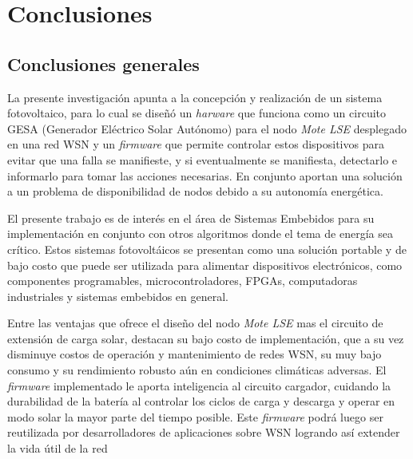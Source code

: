 
\chapter{Conclusiones} %

\label{Chapter5} %

\section{Conclusiones generales}

La presente investigación apunta a la concepción y realización de un sistema fotovoltaico, para lo cual se diseñó un \textit{harware} que funciona como un circuito GESA (Generador Eléctrico Solar Autónomo) para el nodo \textit{Mote LSE} desplegado en una red WSN y un \textit{firmware} que permite controlar estos dispositivos para evitar que una falla se manifieste, y si eventualmente se manifiesta, detectarlo e informarlo para tomar las acciones necesarias. En conjunto aportan una solución a un problema de disponibilidad de nodos debido a su autonomía energética.


El presente trabajo es de interés en el área de Sistemas Embebidos para su implementación en conjunto con otros algoritmos donde el tema de energía sea crítico. Estos sistemas fotovoltáicos se presentan como una solución portable y de bajo costo que puede ser utilizada para alimentar dispositivos electrónicos, como componentes programables, microcontroladores, FPGAs, computadoras industriales y sistemas embebidos en general.

Entre las ventajas que ofrece el diseño del nodo \textit{Mote LSE} mas el circuito de extensión de carga solar, destacan su bajo costo de implementación, que a su vez disminuye costos de operación y mantenimiento de redes WSN, su muy bajo consumo y su rendimiento robusto aún en condiciones climáticas adversas. El \textit{firmware} implementado le aporta inteligencia al circuito cargador, cuidando la durabilidad de la batería al controlar los ciclos de carga y descarga y operar en modo solar la mayor parte del tiempo posible. Este \textit{firmware} podrá luego ser reutilizada por desarrolladores de aplicaciones sobre WSN logrando así extender la vida útil de la red

